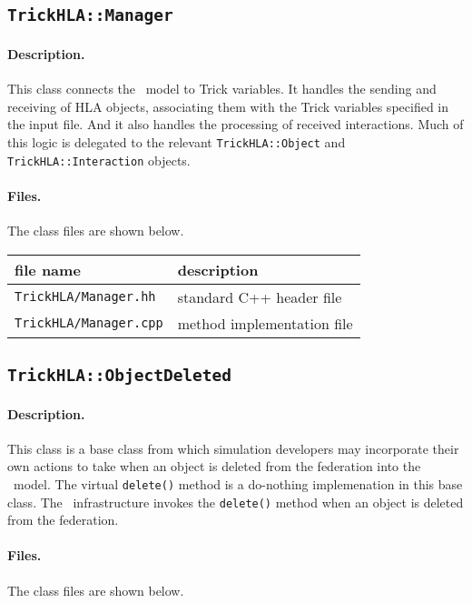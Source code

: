 \subsection{{\tt TrickHLA::Manager}}

\paragraph{Description.}
This class connects the \TrickHLA\ model to Trick variables.
It handles the sending and receiving of HLA objects, associating them
with the Trick variables specified in the input file.
And it also handles the processing of received interactions.
Much of this logic is delegated to the relevant {\tt TrickHLA::Object}
and {\tt TrickHLA::Interaction} objects.

\paragraph{Files.}
The class files are shown below.
   
{
  \scriptsize
  \begin{tabular}{|l|l|} 
    \hline
    file name & description \\
    \hline \hline
    {\tt TrickHLA/Manager.hh} 
    & standard C++ header file
    \\ \hline
    {\tt TrickHLA/Manager.cpp} 
    & method implementation file
    \\ \hline
  \end{tabular}
}

\subsection{{\tt TrickHLA::ObjectDeleted}}

\paragraph{Description.}
This class is a base class from which simulation developers may
incorporate their own actions to take when an object is deleted from the
federation into the \TrickHLA\ model.
The virtual {\tt delete()} method is a do-nothing implemenation 
in this base class.
The \TrickHLA\ infrastructure invokes the {\tt delete()} method when an object 
is deleted from the federation.


\paragraph{Files.}
The class files are shown below.
   
